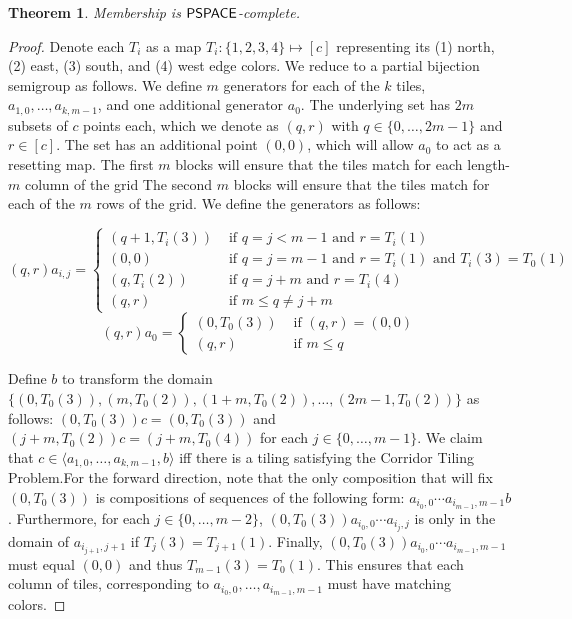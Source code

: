 \documentclass{amsart}
\newcommand{\PSPACE}{\ensuremath\mathsf{PSPACE}}
\newtheorem{theorem}{Theorem}[section]
\theoremstyle{remark}
\numberwithin{equation}{section}
\begin{document}
\iffalse %
\begin{theorem} \label{memthm}
  Membership is $\PSPACE$-complete.
\end{theorem}
\begin{proof}
Denote each $T_i$ as a map $T_i: \{1,2,3,4\} \mapsto [c]$ representing its (1) north, (2) east, (3) south, and (4) west edge colors. We reduce to a partial bijection semigroup as follows. We define $m$ generators for each of the $k$ tiles, $a_{1,0},\dots,a_{k,m-1}$, and one additional generator $a_0$. The underlying set has $2m$ subsets of $c$ points each, which we denote as $(q,r)$ with $q \in \{0,\dots,2m-1\}$ and $r \in [c]$. The set has an additional point $(0,0)$, which will allow $a_0$ to act as a resetting map. The first $m$ blocks will ensure that the tiles match for each length-$m$ column of the grid  The second $m$ blocks will ensure that the tiles match for each of the $m$ rows of the grid. We define the generators as follows:

$$
(q,r)a_{i,j} = \begin{cases}
(q+1,T_i(3)) & \text{ if } q = j  < m - 1 \text{ and } r = T_i(1) \\
(0,0) & \text{ if } q = j  = m - 1 \text{ and } r = T_i(1) \text{ and } T_i(3) = T_0(1)\\
(q,T_i(2)) & \text{ if } q = j+m \text{ and } r = T_i(4) \\
(q,r) & \text{ if }  m \leq q \neq j+m
\end{cases}
$$
$$
(q,r)a_0 = \begin{cases}
(0,T_0(3)) & \text{ if } (q,r) = (0,0) \\
(q,r) & \text{ if } m \leq q
\end{cases}
$$

Define $b$ to transform the domain $\{(0,T_0(3)),(m,T_0(2)),(1+m,T_0(2)),\dots,(2m-1,T_0(2))\}$ as follows: $(0,T_0(3))c = (0,T_0(3))$ and $(j+m,T_0(2))c = (j+m,T_0(4))$ for each $j \in \{0,\dots,m-1\}$. We claim that $c \in \langle a_{1,0},\dots,a_{k,m-1}, b \rangle$ iff there is a tiling satisfying the Corridor Tiling Problem.For the forward direction, note that the only composition that will fix $(0,T_0(3))$ is compositions of sequences of the following form: $a_{i_0,0} \cdots a_{i_{m-1},m-1} b$. Furthermore, for each $j \in \{0,\dots,m-2\}$, $(0,T_0(3))a_{i_0,0} \cdots a_{i_j,j}$ is only in the domain of $a_{i_{j+1},j+1}$ if $T_j(3) = T_{j+1}(1)$. Finally, $(0,T_0(3))a_{i_0,0} \cdots a_{i_{m-1},m-1}$ must equal $(0,0)$ and thus $T_{m-1}(3) = T_0(1)$. This ensures that each column of tiles, corresponding to $a_{i_0,0},\dots,a_{i_{m-1},m-1}$ must have matching colors.


\end{proof}
\end{document}
